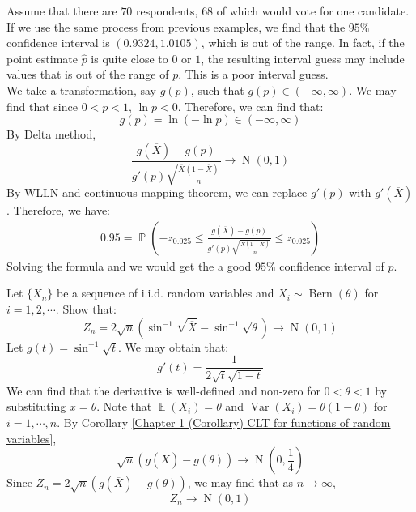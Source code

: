 \documentclass{huhtakm-template-book-v2}
\DeclareMathOperator{\prob}{\mathbb{P}}
\DeclareMathOperator{\E}{\mathbb{E}}
\DeclareMathOperator{\Var}{Var}
\DeclareMathOperator{\Bern}{Bern}
\DeclareMathOperator{\N}{N}
\begin{document}
\newpage
\begin{eg}
	Assume that there are $70$ respondents, $68$ of which would vote for one candidate.\\
	If we use the same process from previous examples, we find that the $95\%$ confidence interval is $(0.9324,1.0105)$, which is out of the range. In fact, if the point estimate $\hat{p}$ is quite close to $0$ or $1$, the resulting interval guess may include values that is out of the range of $p$. This is a poor interval guess.\\
	We take a transformation, say $g(p)$, such that $g(p)\in(-\infty,\infty)$. We may find that since $0<p<1$, $\ln{p}<0$. Therefore, we can find that:
	\begin{equation*}
		g(p)=\ln(-\ln{p})\in(-\infty,\infty)
	\end{equation*}
	By Delta method,
	\begin{equation*}
		\frac{g(\overline{X})-g(p)}{g'(p)\sqrt{\frac{\overline{X}(1-\overline{X})}{n}}}\to\N(0,1)
	\end{equation*}
	By WLLN and continuous mapping theorem, we can replace $g'(p)$ with $g'(\overline{X})$. Therefore, we have:
	\begin{align*}
		0.95=\prob\left(-z_{0.025}\leq	\frac{g(\overline{X})-g(p)}{g'(p)\sqrt{\frac{\overline{X}(1-\overline{X})}{n}}}\leq z_{0.025}\right)
	\end{align*}
	Solving the formula and we would get the a good $95\%$ confidence interval of $p$.
\end{eg}
\begin{eg}
	Let $\{X_{n}\}$ be a sequence of i.i.d. random variables and $X_{i}\sim\Bern(\theta)$ for $i=1,2,\cdots$. Show that:
	\begin{equation*}
		Z_{n}=2\sqrt{n}\left(\sin^{-1}{\sqrt{\overline{X}}}-\sin^{-1}{\sqrt{\theta}}\right)\to\N(0,1)
	\end{equation*}
	Let $g(t)=\sin^{-1}{\sqrt{t}}$. We may obtain that:
	\begin{equation*}
		g'(t)=\frac{1}{2\sqrt{t}\sqrt{1-t}}
	\end{equation*}
	We can find that the derivative is well-defined and non-zero for $0<\theta<1$ by substituting $x=\theta$. Note that $\E(X_{i})=\theta$ and $\Var(X_{i})=\theta(1-\theta)$ for $i=1,\cdots,n$. By Corollary \ref{Chapter 1 (Corollary) CLT for functions of random variables},
	\begin{equation*}
		\sqrt{n}(g(\overline{X})-g(\theta))\to\N\left(0,\frac{1}{4}\right)
	\end{equation*}
	Since $Z_{n}=2\sqrt{n}(g(\overline{X})-g(\theta))$, we may find that as $n\to\infty$,
	\begin{equation*}
		Z_{n}\to\N(0,1)
	\end{equation*}
\end{eg}
\end{document}
